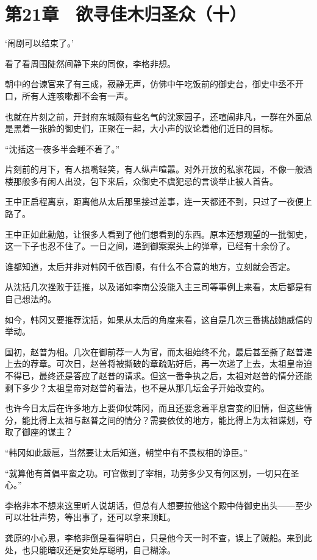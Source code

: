 \section{第21章　欲寻佳木归圣众（十）}

‘闹剧可以结束了。’

看了看周围陡然间静下来的同僚，李格非想。

朝中的台谏官来了有三成，寂静无声，仿佛中午吃饭前的御史台，御史中丞不开口，所有人连咳嗽都不会有一声。

也就在片刻之前，开封府东城颇有些名气的沈家园子，还喧闹非凡，一群在外面总是黑着一张脸的御史们，正聚在一起，大小声的议论着他们近日的目标。

“沈括这一夜多半会睡不着了。”

片刻前的月下，有人捂嘴轻笑，有人纵声喧嚣。对外开放的私家花园，不像一般酒楼那般多有闲人出没，包下来后，众御史不虞犯忌的言谈举止被人首告。

王中正启程离京，距离他从太后那里接过差事，连一天都还不到，只过了一夜便上路了。

王中正如此勤勉，让很多人看到了他们想看到的东西。原本还想观望的一批御史，这一下子也忍不住了。一日之间，递到御案案头上的弹章，已经有十余份了。

谁都知道，太后并非对韩冈千依百顺，有什么不合意的地方，立刻就会否定。

从沈括几次挫败于廷推，以及诸如李南公没能入主三司等事例上来看，太后都是有自己想法的。

如今，韩冈又要推荐沈括，如果从太后的角度来看，这自是几次三番挑战她威信的举动。

国初，赵普为相。几次在御前荐一人为官，而太祖始终不允，最后甚至撕了赵普递上去的荐章。可次日，赵普将被撕破的章疏贴好后，再一次递了上去，太祖皇帝迫不得已，最终还是答应了赵普的请求。但这一番争执之后，太祖对赵普的情分还能剩下多少？太祖皇帝对赵普的看法，也不是从那几坛金子开始改变的。

也许今日太后在许多地方上要仰仗韩冈，而且还要念着平息宫变的旧情，但这些情分，能比得上太祖与赵普之间的情分？需要依仗的地方，能比得上为太祖谋划，夺取了御座的谋主？

“韩冈如此跋扈，当然要让太后知道，朝堂中有不畏权相的诤臣。”

“就算他有首倡平蛮之功。可官做到了宰相，功劳多少又有何区别，一切只在圣心。”

李格非本不想来这里听人说胡话，但总有人想要拉他这个殿中侍御史出头——至少可以壮壮声势，等出事了，还可以拿来顶缸。

龚原的小心思，李格非倒是看得明白，只是他今天一时不查，误上了贼船。来到此处，也只能暗叹还是安处厚聪明，自己糊涂。

